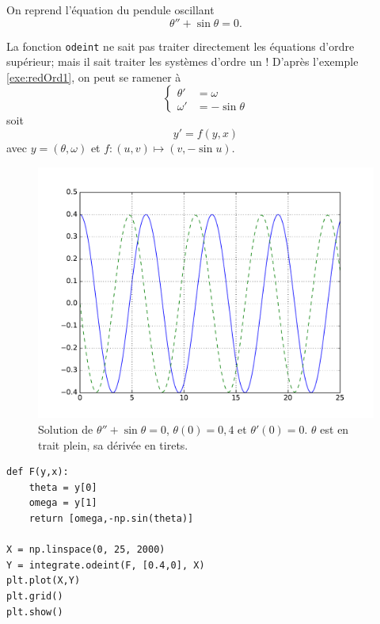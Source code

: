 \documentclass[../main.tex]{subfiles}
\begin{document}
\begin{exe}[Ordre 2]
	On reprend l'équation du pendule oscillant
	\begin{equation*}
		\theta'' + \sin\theta = 0.
	\end{equation*}

La fonction \texttt{odeint} ne sait pas traiter directement les équations d'ordre supérieur; mais il sait traiter les systèmes d'ordre un ! D'après l'exemple \ref{exe:redOrd1}, on peut se ramener à
	\begin{equation*}
	\left\lbrace
	\begin{array}{ll}
		\theta' &= \omega \\
		\omega' &= -\sin\theta
	\end{array}
	\right.
	\end{equation*}
soit
	\[
	y' = f(y,x)
	\]
avec $y=(\theta,\omega)$ et $f:(u,v)\mapsto (v,-\sin u)$.

\begin{figure}[h]
	\includegraphics[width=\textwidth]{figures/figure_2.pdf}
	\caption{Solution de $\theta'' + \sin\theta = 0$, $\theta(0)=0,4$ et $\theta'(0)=0$. $\theta$ est en trait plein, sa dérivée en tirets.}
\end{figure}

\begin{verbatim}
def F(y,x):
    theta = y[0]
    omega = y[1]
    return [omega,-np.sin(theta)]

X = np.linspace(0, 25, 2000)
Y = integrate.odeint(F, [0.4,0], X)
plt.plot(X,Y)
plt.grid()
plt.show()
\end{verbatim}
\end{exe}
\end{document}
